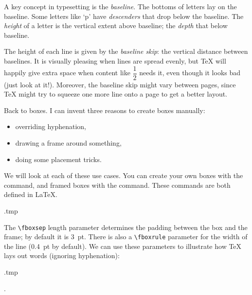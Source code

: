 A key concept in typesetting is the \emph{baseline}.
The bottoms of letters lay on the baseline.
Some letters like `p' have \emph{descenders} that drop below the baseline.
The \emph{height} of a letter is the vertical extent above baseline;
the \emph{depth} that below baseline.
%
\begin{center}
\newcommand\ExampleText{\normalfont\fontsize{48pt}{48pt}\selectfont Typography}
\newlength\Myheight
\settoheight\Myheight{\ExampleText}
\newlength\Mydepth
\settodepth\Mydepth{\ExampleText}
%
\end{center}

The height of each line is given by the \emph{baseline skip}:
the vertical distance between baselines.
It is visually pleasing when lines are spread evenly,
but \TeX{} will happily give extra space when content like $\dfrac 1 2$ needs it,
even though it looks bad (just look at it!).
Moreover, the baseline skip might vary between pages,
since \TeX{} might try to squeeze one more line onto a page to get a better layout.

Back to boxes.
I can invent three reasons to create boxes manually:
\begin{itemize}
    \item overriding hyphenation,
    \item drawing a frame around something,
    \item doing some placement tricks.
\end{itemize}
We will look at each of these use cases.
You can create your own boxes with the  command,
and framed boxes with the  command.
These commands are both defined in \LaTeX{}.
%
\begin{VerbatimOut}{\jobname.tmp}
\end{VerbatimOut}
\ShowExample
%
The \verb|\fboxsep| length parameter determines the padding between the box and the frame;
by default it is 3~pt.
There is also a \verb|\fboxrule| parameter for the width of the line (0.4~pt by default).
We can use these parameters to illustrate how \TeX{} lays out words (ignoring hyphenation):
%
\begin{VerbatimOut}{\jobname.tmp}
\setlength\fboxsep{0pt}

  
  
 
.
\end{VerbatimOut}
\ShowExample

